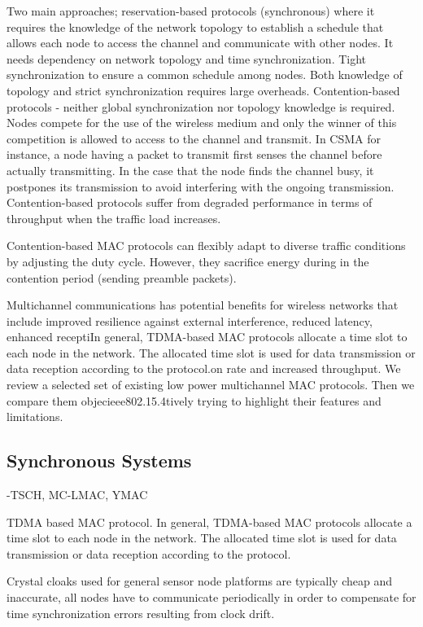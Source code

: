 Two main approaches; reservation-based protocols (synchronous) where it requires the knowledge of the network topology to establish a schedule that allows each node to access the channel and communicate with other nodes. It needs dependency on network topology and time synchronization. Tight synchronization to ensure a common schedule among nodes. Both knowledge of topology and strict synchronization requires large overheads. Contention-based protocols - neither global synchronization nor topology knowledge is required. Nodes compete for the use of the wireless medium and only the winner of this competition is allowed to access to the channel and transmit. In CSMA for instance, a node having a packet to transmit first senses the channel before actually transmitting. In the case that the node finds the channel busy, it postpones its transmission to avoid interfering with the ongoing transmission. Contention-based protocols suffer from degraded performance in terms of throughput when the traffic load increases. \cite{macsurvey}

Contention-based MAC protocols can flexibly adapt to diverse traffic conditions by adjusting the duty cycle. However, they sacrifice energy during in the contention period (sending preamble packets). \cite{y-mac}

Multichannel communications has potential benefits for wireless networks that include improved resilience against external interference, reduced latency, enhanced receptiIn general, TDMA-based MAC protocols allocate a time slot to each node in the network. The allocated time slot is used for data transmission or data reception according to the protocol.on rate and increased throughput. We review a selected set of existing low power multichannel MAC protocols. Then we compare them objecieee802.15.4tively trying to highlight their features and limitations. 

\subsection{Synchronous Systems}
-TSCH, MC-LMAC, YMAC

TDMA based MAC protocol.
In general, TDMA-based MAC protocols allocate a time slot to each node in the network. The allocated time slot is used for data transmission or data reception according to the protocol. \cite{y-mac}

Crystal cloaks used for general sensor node platforms are typically cheap and inaccurate, all nodes have to communicate periodically in order to compensate for time synchronization errors resulting from clock drift. \cite{y-mac}

